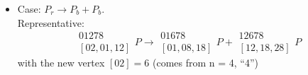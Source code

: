 \documentclass[a4paper,12pt]{amsart}
\numberwithin{equation}{section}
\begin{document}
\begin{itemize}
	\item Case: $P_r \rightarrow P_b + P_b$. \\
	Representative: 
	$$ \begin{array}{c} 01278 \\ \left[02,01,12\right] \end{array} P
	\rightarrow 
	\begin{array}{c} 01678 \\ \left[01,08,18\right] \end{array} P +
	\begin{array}{c} 12678 \\ \left[12,18,28\right] \end{array} P $$
	with the new vertex $\left[02\right] = 6$ (comes from n = 4, ``4'')


\begin{minipage}[]{0.5\textwidth}
  \begin{center}
	

\end{center}
\end{minipage}
\end{itemize}
\end{document}
